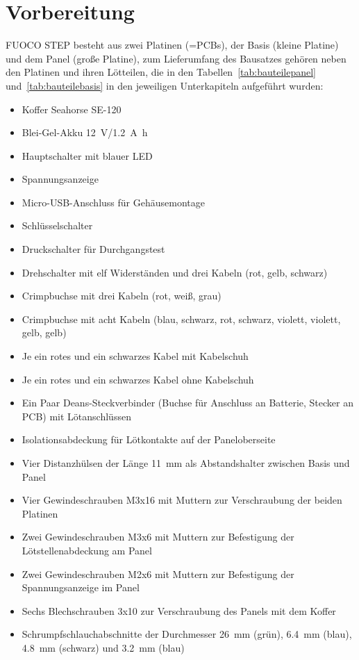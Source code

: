 \documentclass[paper=a4, open=any, numbers=noenddot]{scrbook}
\begin{document}
	\chapter{Vorbereitung}
		FUOCO STEP besteht aus zwei Platinen (=PCBs), der Basis (kleine Platine) und dem Panel (große Platine), zum Lieferumfang des Bausatzes gehören neben den Platinen und ihren Lötteilen, die in den Tabellen~\ref{tab:bauteilepanel} und~\ref{tab:bauteilebasis} in den jeweiligen Unterkapiteln aufgeführt wurden:
		\begin{itemize}
			\item
			      Koffer Seahorse SE-120
			\item
			      Blei-Gel-Akku \SI{12}{\volt}/\SI{1,2}{\ampere\hour}
			\item
			      Hauptschalter mit blauer LED
			\item
			      Spannungsanzeige
			\item
			      Micro-USB-Anschluss für Gehäusemontage
			\item
			      Schlüsselschalter
			\item
			      Druckschalter für Durchgangstest
			\item
			      Drehschalter mit elf Widerständen und drei Kabeln (rot, gelb, schwarz)
			\item
			      Crimpbuchse mit drei Kabeln (rot, weiß, grau)
			\item
			      Crimpbuchse mit acht Kabeln (blau, schwarz, rot, schwarz, violett, violett, gelb, gelb)
			\item
			      Je ein rotes und ein schwarzes Kabel mit Kabelschuh
			\item
			      Je ein rotes und ein schwarzes Kabel ohne Kabelschuh
			\item
			      Ein Paar Deans-Steckverbinder (Buchse für Anschluss an Batterie, Stecker an PCB) mit Lötanschlüssen
			\item
			      Isolationsabdeckung für Lötkontakte auf der Paneloberseite
			\item
			      Vier Distanzhülsen der Länge \SI{11}{\milli\metre} als Abstandshalter zwischen Basis und Panel
			\item
			      Vier Gewindeschrauben M3x16 mit Muttern zur Verschraubung der beiden Platinen
			\item
			      Zwei Gewindeschrauben M3x6 mit Muttern zur Befestigung der Lötstellenabdeckung am Panel
			\item
			      Zwei Gewindeschrauben M2x6 mit Muttern zur Befestigung der Spannungsanzeige im Panel
			\item
			      Sechs Blechschrauben 3x10 zur Verschraubung des Panels mit dem Koffer
			\item
			      Schrumpfschlauchabschnitte der Durchmesser \SI{26}{\milli\metre} (grün), \SI{6,4}{\milli\metre} (blau), \SI{4,8}{\milli\metre} (schwarz) und \SI{3,2}{\milli\metre} (blau)
		\end{itemize}
\end{document}

